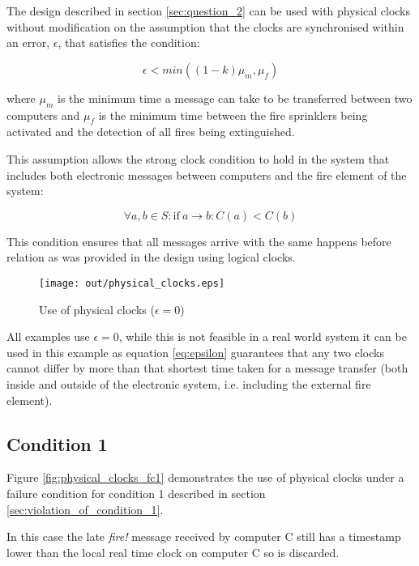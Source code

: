 \documentclass[twocolumn]{article}
\begin{document}
The design described in section \ref{sec:question_2} can be used with physical
clocks without modification on the assumption that the clocks are synchronised
within an error, $\epsilon$, that satisfies the condition:

\begin{equation}
  \epsilon < min((1-k) \mu_{m}, \mu_{f})
  \label{eq:epsilon}
\end{equation}

where $\mu_{m}$ is the minimum time a message can take to be transferred between
two computers and $\mu_{f}$ is the minimum time between the fire sprinklers
being activated and the detection of all fires being extinguished.

This assumption allows the strong clock condition to hold in the system that
includes both electronic messages between computers and the fire element of the
system:

\begin{equation}
  \forall a, b \in S : \mathrm{if} \: a \rightarrow b : C(a) < C(b)
  \label{eq:strong_clock_condition}
\end{equation}

This condition ensures that all messages arrive with the same happens before
relation as was provided in the design using logical clocks.

\begin{figure}[h!]
  \centering
  \texttt{[image: out/physical\_clocks.eps]}
  \caption{Use of physical clocks ($\epsilon = 0$)}
  \label{fig:physical_clocks}
\end{figure}

All examples use $\epsilon = 0$, while this is not feasible in a real world
system it can be used in this example as equation \ref{eq:epsilon} guarantees
that any two clocks cannot differ by more than that shortest time taken for a
message transfer (both inside and outside of the electronic system, i.e.
including the external fire element).

\subsection{Condition 1}

Figure \ref{fig:physical_clocks_fc1} demonstrates the use of physical clocks
under a failure condition for condition 1 described in section
\ref{sec:violation_of_condition_1}.

In this case the late \textit{fire!} message received by computer C still has a
timestamp lower than the local real time clock on computer C so is discarded.
\end{document}
